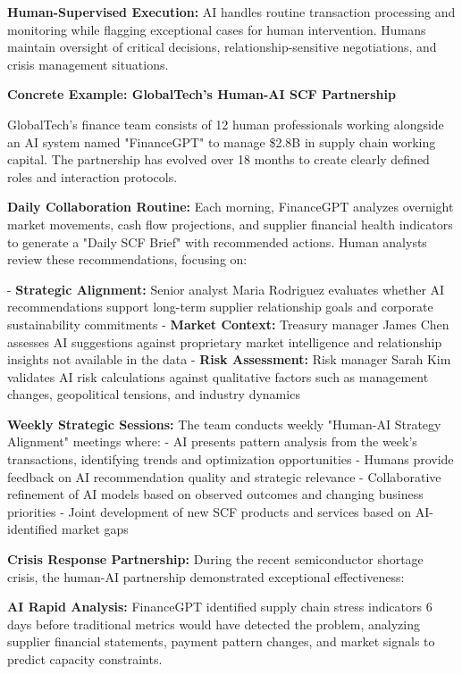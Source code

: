 \documentclass{article}
\begin{document}
\textbf{Human-Supervised Execution:} AI handles routine transaction processing and monitoring while flagging exceptional cases for human intervention. Humans maintain oversight of critical decisions, relationship-sensitive negotiations, and crisis management situations.

\textbf{Concrete Example: GlobalTech's Human-AI SCF Partnership}

GlobalTech's finance team consists of 12 human professionals working alongside an AI system named "FinanceGPT" to manage \$2.8B in supply chain working capital. The partnership has evolved over 18 months to create clearly defined roles and interaction protocols.

\textbf{Daily Collaboration Routine:}
Each morning, FinanceGPT analyzes overnight market movements, cash flow projections, and supplier financial health indicators to generate a "Daily SCF Brief" with recommended actions. Human analysts review these recommendations, focusing on:

- \textbf{Strategic Alignment:} Senior analyst Maria Rodriguez evaluates whether AI recommendations support long-term supplier relationship goals and corporate sustainability commitments
- \textbf{Market Context:} Treasury manager James Chen assesses AI suggestions against proprietary market intelligence and relationship insights not available in the data
- \textbf{Risk Assessment:} Risk manager Sarah Kim validates AI risk calculations against qualitative factors such as management changes, geopolitical tensions, and industry dynamics

\textbf{Weekly Strategic Sessions:}
The team conducts weekly "Human-AI Strategy Alignment" meetings where:
- AI presents pattern analysis from the week's transactions, identifying trends and optimization opportunities
- Humans provide feedback on AI recommendation quality and strategic relevance
- Collaborative refinement of AI models based on observed outcomes and changing business priorities
- Joint development of new SCF products and services based on AI-identified market gaps

\textbf{Crisis Response Partnership:}
During the recent semiconductor shortage crisis, the human-AI partnership demonstrated exceptional effectiveness:

\textbf{AI Rapid Analysis:} FinanceGPT identified supply chain stress indicators 6 days before traditional metrics would have detected the problem, analyzing supplier financial statements, payment pattern changes, and market signals to predict capacity constraints.
\end{document}
